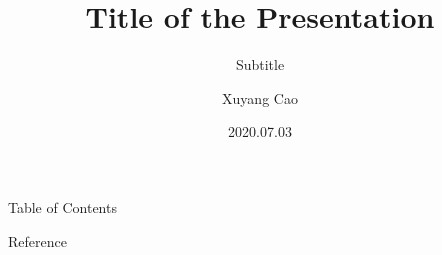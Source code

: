\documentclass[t,12pt]{beamer} %
\title{Title of the Presentation}
\subtitle{Subtitle}
\institute{\url{https://github.com/xuyangcao}}
\author{Xuyang Cao}
\date{2020.07.03}
\begin{document}
\frame[plain]{\titlepage}           

\begin{frame}{Table of Contents}           %
    \setcounter{tocdepth}{1}               %
    \tableofcontents                       %
\end{frame}

 

\begin{frame}{Reference}
    \vspace{-0.5em}
    
    \tiny
\end{frame}
\end{document}
